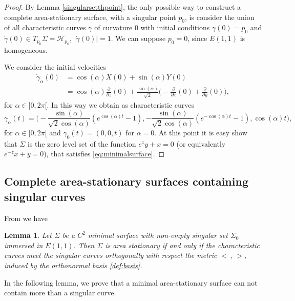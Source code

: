 \documentclass[10pt]{amsart}
\newtheorem{lemma}[theorem]{Lemma}
\theoremstyle{definition}
\theoremstyle{remark}
\numberwithin{equation}{section}
\begin{document}
\begin{proof} By Lemma \ref{singularsetthpoint}, the only possible way to construct a complete area-stationary surface, with a singular point $p_0$, is consider the union of all characteristic curves ${\gamma}$ of curvature $0$ with initial conditions ${\gamma}(0)=p_0$ and $\dot{\gamma}(0)\in T_{p_0}{\Sigma}={\mathcal{H}}_{p_0}$, $|\dot{\gamma}(0)|=1$. We can suppose $p_0=0$, since ${E(1,1)}$ is homogeneous. 

We consider the initial velocities
\begin{equation*}
\begin{split}
\dot{\gamma}_\alpha(0)&=\cos(\alpha)X(0)+\sin(\alpha)Y(0)\\
&=\cos(\alpha)\frac{\partial}{\partial z}(0)+\frac{\sin(\alpha)}{\sqrt{2}}\bigg(-\frac{\partial}{\partial x}(0)+\frac{\partial}{\partial y}(0)\bigg),
\end{split}
\end{equation*}
for $\alpha\in[0,2\pi[$. In this way we obtain as characteristic curves
\begin{equation}
{\gamma}_\alpha(t)=\bigg(-\frac{\sin(\alpha)}{\sqrt{2}\cos(\alpha)}(e^{\cos(\alpha)t}-1), -\frac{\sin(\alpha)}{\sqrt{2}\cos(\alpha)}(e^{-\cos(\alpha)t}-1),
\cos(\alpha)t\bigg),
\end{equation}
for $\alpha\in]0,2\pi[$ and ${\gamma}_0(t)=(0,0,t)$ for $\alpha=0$. At this point it is easy show that ${\Sigma}$ is the zero level set of the function $e^zy+x=0$ (or equivalently $e^{-z}x+y=0$), that satisfies \eqref{eq:minimalsurface}.

\end{proof}

\subsection{Complete area-stationary surfaces containing singular curves}
From \cite[Corollary~5.4]{MR3044134} we have 

\begin{lemma}\label{charmeetsingular} Let ${\Sigma}$ be a ${C}^2$  minimal surface with non-empty singular set ${\Sigma}_{0}$ immersed in ${E(1,1)}$. Then ${\Sigma}$ is area stationary if and only if the characteristic curves meet the singular curves orthogonally with respect the metric ${\big<{\, ,\, }\big>}$, induced by the orthonormal basis \eqref{def:basis}. 
\end{lemma}

In the following lemma, we prove that a minimal area-stationary surface can not contain more than a singular curve.
\end{document}
